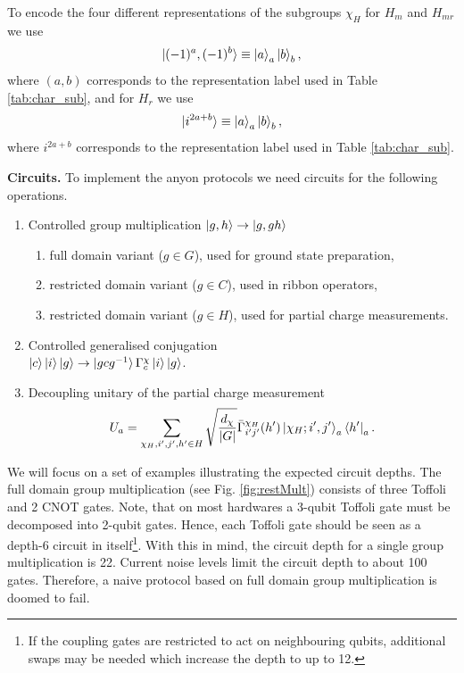 \documentclass[a4paper,twocolumn,11pt, accepted=2024-06-14]{quantumarticle}
\begin{document}
To encode the four different representations of the subgroups $\chi_H$ for $H_m$ and $H_{mr}$ we use
\begin{equation}
    \ket{(-1)^a,(-1)^b} \equiv \ket{a}_a\ket{b}_b, \label{eq:enc_irr1}
\end{equation}
where $(a,b)$ corresponds to the representation label used in Table \ref{tab:char_sub}, 
and for $H_{r}$ we use
\begin{equation}
    \ket{i^{2a+b}} \equiv \ket{a}_a\ket{b}_b, \label{eq:enc_irr2}
\end{equation}
where $i^{2a+b}$ corresponds to the representation label used in Table \ref{tab:char_sub}.


\textbf{Circuits.} To implement the anyon protocols we need circuits for the following operations.
\begin{enumerate}
    \item Controlled group multiplication $\ket{g, h} \rightarrow \ket{g, gh}$  \begin{enumerate}
        \item full domain variant ($g \in G$), used for ground state preparation,
        \item restricted domain variant ($g \in C$), used in ribbon operators,
        \item restricted domain variant ($g \in H$), used for partial charge measurements. 
    \end{enumerate}
    \item Controlled generalised conjugation\\ $\ket{c} \ket{i}\ket{g} \rightarrow \ket{gcg^{-1}} \Gamma^\chi_{c} \ket{i}\ket{g}$.
    \item Decoupling unitary of the partial charge measurement $$ U_a = \sum_{\chi_H,i', j',h'\in H} \sqrt{\frac{d_\chi}{|G|}} \bar \Gamma^{\chi_H}_{i'j'}(h')  \ket{\chi_H; i', j'}_a\bra{h'}_a. $$
\end{enumerate} 


We will focus on a set of examples illustrating the expected circuit depths. The full domain group multiplication (see Fig. \ref{fig:restMult}) consists of three Toffoli and 2 CNOT gates. Note, that on most hardwares a 3-qubit Toffoli gate must be decomposed into 2-qubit gates. Hence, each Toffoli gate should be seen as a depth-6 circuit in itself\footnote{If the coupling gates are restricted to act on neighbouring qubits, additional swaps may be needed which increase the depth to up to 12.}. With this in mind, the circuit depth for a single group multiplication is 22. Current noise levels limit the circuit depth to about 100 gates. Therefore, a naive protocol based on full domain group multiplication is doomed to fail. 
\end{document}
